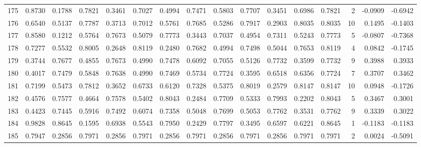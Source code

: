 \begin{tabular}{lrrrrrrrrrrrrrrr}
175 &      0.8730 &  0.1788 &  0.7821 &  0.3461 &  0.7027 &  0.4994 &  0.7471 &  0.5803 &  0.7707 &  0.3451 &   0.6986 &     0.7821 &      2 &                   -0.0909 &                    -0.6942 \\
176 &      0.6540 &  0.5137 &  0.7787 &  0.3713 &  0.7012 &  0.5761 &  0.7685 &  0.5286 &  0.7917 &  0.2903 &   0.8035 &     0.8035 &     10 &                    0.1495 &                    -0.1403 \\
177 &      0.8580 &  0.1212 &  0.5764 &  0.7673 &  0.5079 &  0.7773 &  0.3443 &  0.7037 &  0.4954 &  0.7311 &   0.5243 &     0.7773 &      5 &                   -0.0807 &                    -0.7368 \\
178 &      0.7277 &  0.5532 &  0.8005 &  0.2648 &  0.8119 &  0.2480 &  0.7682 &  0.4994 &  0.7498 &  0.5044 &   0.7653 &     0.8119 &      4 &                    0.0842 &                    -0.1745 \\
179 &      0.3744 &  0.7677 &  0.4855 &  0.7673 &  0.4990 &  0.7478 &  0.6092 &  0.7055 &  0.5126 &  0.7732 &   0.3599 &     0.7732 &      9 &                    0.3988 &                     0.3933 \\
180 &      0.4017 &  0.7479 &  0.5848 &  0.7638 &  0.4990 &  0.7469 &  0.5734 &  0.7724 &  0.3595 &  0.6518 &   0.6356 &     0.7724 &      7 &                    0.3707 &                     0.3462 \\
181 &      0.7199 &  0.5473 &  0.7812 &  0.3652 &  0.6733 &  0.6120 &  0.7328 &  0.5375 &  0.8019 &  0.2579 &   0.8147 &     0.8147 &     10 &                    0.0948 &                    -0.1726 \\
182 &      0.4576 &  0.7577 &  0.4664 &  0.7578 &  0.5402 &  0.8043 &  0.2484 &  0.7709 &  0.5333 &  0.7993 &   0.2202 &     0.8043 &      5 &                    0.3467 &                     0.3001 \\
183 &      0.4423 &  0.7445 &  0.5916 &  0.7492 &  0.6074 &  0.7358 &  0.5048 &  0.7699 &  0.5053 &  0.7762 &   0.3531 &     0.7762 &      9 &                    0.3339 &                     0.3022 \\
184 &      0.9828 &  0.8645 &  0.1595 &  0.6938 &  0.5543 &  0.7950 &  0.2429 &  0.7797 &  0.3495 &  0.6597 &   0.6221 &     0.8645 &      1 &                   -0.1183 &                    -0.1183 \\
185 &      0.7947 &  0.2856 &  0.7971 &  0.2856 &  0.7971 &  0.2856 &  0.7971 &  0.2856 &  0.7971 &  0.2856 &   0.7971 &     0.7971 &      2 &                    0.0024 &                    -0.5091 \\

\end{tabular}
